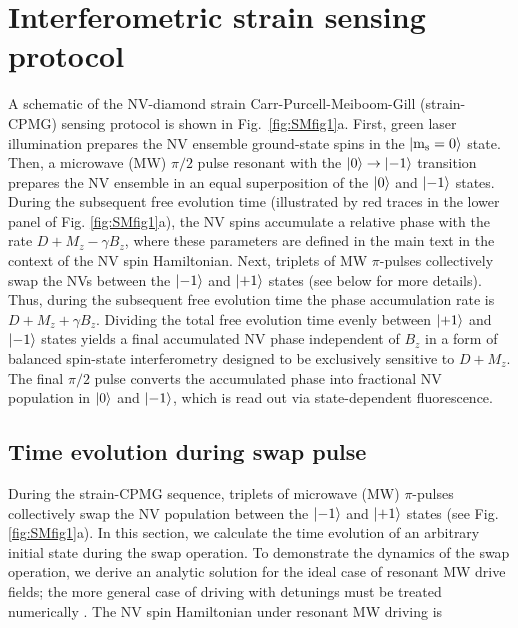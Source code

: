 \documentclass[reprint,superscriptaddress,hyphens,amsmath,amssymb,aps,prx,float]{revtex4-2}
\begin{document}
\appendix

\section{Interferometric strain sensing protocol}
\label{sec:scpmg}
A schematic of the NV-diamond strain Carr-Purcell-Meiboom-Gill (strain-CPMG) sensing protocol is shown in Fig.~\ref{fig:SMfig1}a. First, green laser illumination prepares the NV ensemble ground-state spins in the $\ket{{\rm m_s} = 0}$ state. Then, a microwave (MW) $\pi/2$ pulse resonant with the $\ket{0}\rightarrow\ket{-1}$ transition prepares the NV ensemble in an equal superposition of the $\ket{0}$ and $\ket{-1}$ states. During the subsequent free evolution time (illustrated by red traces in the lower panel of Fig. \ref{fig:SMfig1}a), the NV spins accumulate a relative phase with the rate $D + M_z - \gamma B_z$, where these parameters are defined in the main text in the context of the NV spin Hamiltonian. Next, triplets of MW $\pi$-pulses collectively swap the NVs between the $\ket{-1}$ and $\ket{+1}$ states (see below for more details). Thus, during the subsequent free evolution time the phase accumulation rate is $D + M_z + \gamma B_z$. Dividing the total free evolution time evenly between $\ket{+1}$ and $\ket{-1}$ states yields a final accumulated NV phase independent of $B_z$ in a form of balanced spin-state interferometry designed to be exclusively sensitive to $D+M_z$. The final $\pi/2$ pulse converts the accumulated phase into fractional NV population in $\ket{0}$ and $\ket{-1}$, which is read out via state-dependent fluorescence.

\smfive


\subsection{Time evolution during swap pulse}
During the strain-CPMG sequence, triplets of microwave (MW) $\pi$-pulses collectively swap the NV population between the $\ket{-1}$ and $\ket{+1}$ states (see Fig. \ref{fig:SMfig1}a). In this section, we calculate the time evolution of an arbitrary initial state during the swap operation.  To demonstrate the dynamics of the swap operation, we derive an analytic solution for the ideal case of resonant MW drive fields; the more general case of driving with detunings must be treated numerically \cite{MaminNanoNMR2013}. The NV spin Hamiltonian under resonant MW driving is
\end{document}
